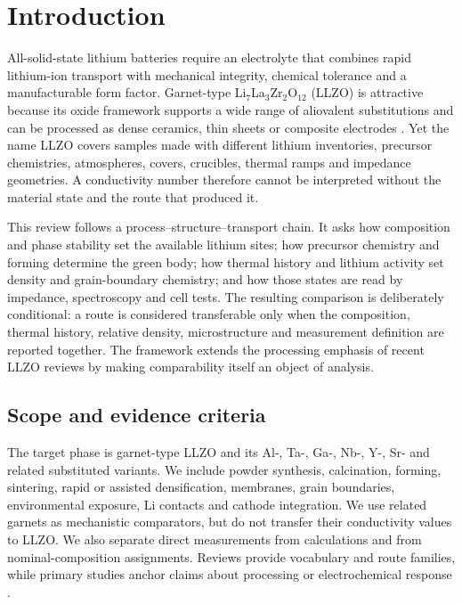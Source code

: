 \section{Introduction}
\label{sec:introduction}

All-solid-state lithium batteries require an electrolyte that combines rapid lithium-ion transport with mechanical integrity, chemical tolerance and a manufacturable form factor. Garnet-type Li$_7$La$_3$Zr$_2$O$_{12}$ (LLZO) is attractive because its oxide framework supports a wide range of aliovalent substitutions and can be processed as dense ceramics, thin sheets or composite electrodes \cite{wang2020garnet,puente2021garnet,kim2020research}. Yet the name LLZO covers samples made with different lithium inventories, precursor chemistries, atmospheres, covers, crucibles, thermal ramps and impedance geometries. A conductivity number therefore cannot be interpreted without the material state and the route that produced it.

This review follows a process--structure--transport chain. It asks how composition and phase stability set the available lithium sites; how precursor chemistry and forming determine the green body; how thermal history and lithium activity set density and grain-boundary chemistry; and how those states are read by impedance, spectroscopy and cell tests. The resulting comparison is deliberately conditional: a route is considered transferable only when the composition, thermal history, relative density, microstructure and measurement definition are reported together. The framework extends the processing emphasis of recent LLZO reviews \cite{cao2019modeling,wang2024accelerating,zhao2024review,sazvar2025review} by making comparability itself an object of analysis.

\subsection{Scope and evidence criteria}

The target phase is garnet-type LLZO and its Al-, Ta-, Ga-, Nb-, Y-, Sr- and related substituted variants. We include powder synthesis, calcination, forming, sintering, rapid or assisted densification, membranes, grain boundaries, environmental exposure, Li contacts and cathode integration. We use related garnets as mechanistic comparators, but do not transfer their conductivity values to LLZO. We also separate direct measurements from calculations and from nominal-composition assignments. Reviews provide vocabulary and route families, while primary studies anchor claims about processing or electrochemical response \cite{wang2020garnet,puente2021garnet,raju2021crystal,chen2022processing,wang2026research}.


